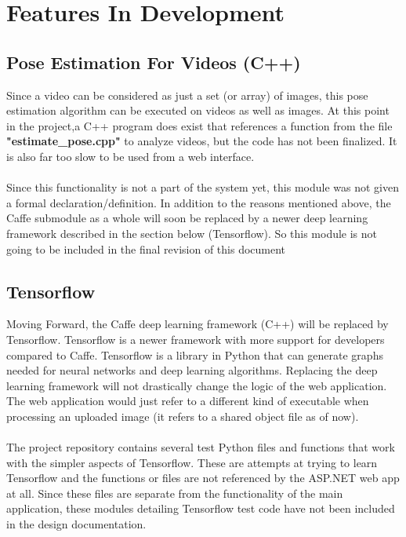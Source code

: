 \documentclass{scrreprt}
\begin{document}
\break

\section{Features In Development}

\subsection{Pose Estimation For Videos (C++)}

Since a video can be considered as just a set (or array) of images, this pose estimation algorithm can be executed on videos as well as images. At this point in the project,a C++ program does exist that references a function from the file \textbf{"estimate\_pose.cpp"} to analyze videos, but the code has not been finalized. It is also far too slow to be used from a web interface.
\\\\
Since this functionality is not a part of the system yet, this module was not given a formal declaration/definition. In addition to the reasons mentioned above, the Caffe submodule as a whole will soon be replaced by a newer deep learning framework described in the section below (Tensorflow). So this module is not going to be included in the final revision of this document

\subsection{Tensorflow}

Moving Forward, the Caffe deep learning framework (C++) will be replaced by Tensorflow. Tensorflow is a newer framework with more support for developers compared to Caffe. Tensorflow is a library in Python that can generate graphs needed for neural networks and deep learning algorithms. Replacing the deep learning framework will not drastically change the logic of the web application. The web application would just refer to a different kind of executable when processing an uploaded image (it refers to a shared object file as of now).
\\\\
The project repository contains several test Python files and functions that work with the simpler aspects of Tensorflow. These are attempts at trying to learn Tensorflow and the functions or files are not referenced by the ASP.NET web app at all. Since these files are separate from the functionality of the main application, these modules detailing Tensorflow test code have not been included in the design documentation.
\end{document}
